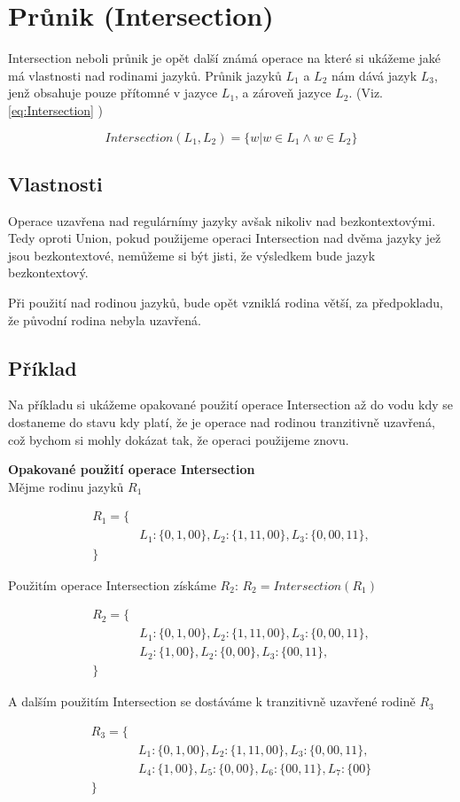 \section{Průnik (Intersection)}
Intersection neboli průnik je opět další známá operace na které si ukážeme jaké má vlastnosti nad rodinami jazyků.
Průnik jazyků $L_{1}$ a $L_{2}$ nám dává jazyk $L_{3}$, jenž obsahuje pouze přítomné v jazyce $L_{1}$, a zároveň jazyce $L_{2}$. (Viz. \ref{eq:Intersection} )

\begin{equation}\label{eq:Intersection}
Intersection(L_{1}, L_{2}) = \{w|w\in L_{1}\land w\in L_{2}\}
\end{equation}

\subsection{Vlastnosti}
Operace uzavřena nad regulárnímy jazyky avšak nikoliv nad bezkontextovými.
Tedy oproti Union, pokud použijeme operaci Intersection nad dvěma jazyky jež jsou bezkontextové, nemůžeme si být jisti, že výsledkem bude jazyk bezkontextový.

Při použití nad rodinou jazyků, bude opět vzniklá rodina větší, za předpokladu, že původní rodina nebyla uzavřená.

\subsection{Příklad}
Na příkladu si ukážeme opakované použití operace Intersection až do vodu kdy se dostaneme do stavu kdy platí, že je operace nad rodinou tranzitivně uzavřená, což bychom si mohly dokázat tak, že operaci použijeme znovu.

\textbf{Opakované použití operace Intersection}\\
Mějme rodinu jazyků $R_{1}$

\begin{equation*}
	\begin{split}
	R_{1} = \{&\\
		&L_{1}: \{0,1,00\}, L_{2}:\{1,11,00\}, L_{3}:\{0,00,11\},\\
	\}&
	\end{split}
\end{equation*}

Použitím operace Intersection získáme $R_{2}$: $R_{2}=Intersection(R_{1})$

\begin{equation*}
\begin{split}
	R_{2} = \{&\\
		&L_{1}: \{0,1,00\}, L_{2}:\{1,11,00\}, L_{3}:\{0,00,11\},\\
		&L_{2}: \{1,00\}, L_{2}:\{0,00\}, L_{3}:\{00,11\},\\
	\}&
\end{split}
\end{equation*}

A dalším použitím Intersection se dostáváme k tranzitivně uzavřené rodině $R_{3}$

\begin{equation*}
\begin{split}
	R_{3} = \{&\\
		&L_{1}: \{0,1,00\}, L_{2}:\{1,11,00\}, L_{3}:\{0,00,11\},\\
		&L_{4}: \{1,00\}, L_{5}:\{0,00\}, L_{6}:\{00,11\},L_{7}: \{00\}\\
	\}&
\end{split}
\end{equation*}
